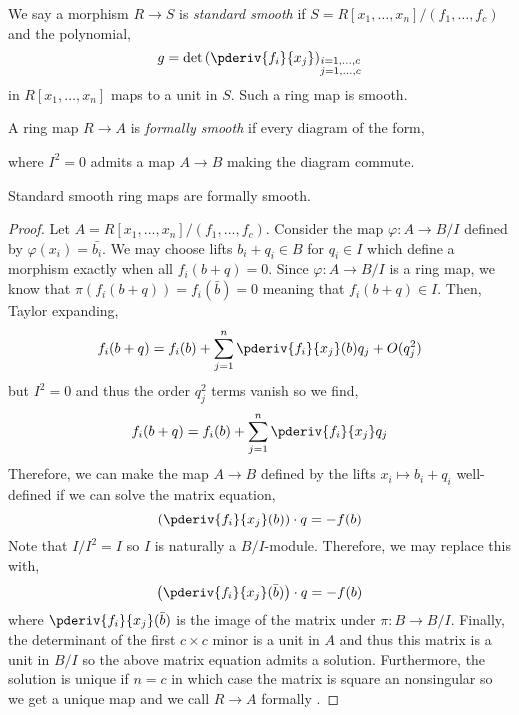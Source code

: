 \documentclass[12pt]{article}
\begin{document}
\begin{example}
We say a morphism $R \to S$ is \textit{standard smooth} if $S = R[x_1, \dots, x_n]/(f_1, \dots, f_c)$ and the polynomial,
\[ g = \det{\left( \pderiv{f_i}{x_j} \right)_{\substack{i = 1, \dots, c \\ j = 1, \dots, c}}} \]
in $R[x_1, \dots, x_n]$ maps to a unit in $S$. Such a ring map is smooth. 
\end{example}

\begin{defn}
A ring map $R \to A$ is \textit{formally smooth} if every diagram of the form,
\begin{center}
\end{center}
where $I^2 = 0$ admits a map $A \to B$ making the diagram commute.
\end{defn}

\begin{prop}
Standard smooth ring maps are formally smooth.
\end{prop}

\begin{proof}
Let $A = R[x_1, \dots, x_n]/(f_1, \dots, f_c)$. Consider the map $\varphi : A \to B / I$ defined by $\varphi(x_i) = \bar{b_i}$. We may choose lifts $b_i + q_i \in B$ for $q_i \in I$ which define a morphism exactly when all $f_i(b + q) = 0$. Since $\varphi : A \to B/I$ is a ring map, we know that $\pi(f_i(b + q)) = f_i(\bar{b}) = 0$ meaning that $f_i(b + q) \in I$. Then, Taylor expanding,
\[ f_i(b + q) = f_i(b) + \sum_{j = 1}^n \pderiv{f_i}{x_j} (b) q_j + O(q_j^2) \]
but $I^2 = 0$ and thus the order $q_j^2$ terms vanish so we find,
\[ f_i(b + q) = f_i(b) + \sum_{j = 1}^n \pderiv{f_i}{x_j} q_j \]
Therefore, we can make the map $A \to B$ defined by the lifts $x_i \mapsto b_i + q_i$ well-defined if we can solve the matrix equation,
\[ \left( \pderiv{f_i}{x_j}(b) \right) \cdot q = - f(b) \]
Note that $I / I^2 = I$ so $I$ is naturally a $B/I$-module. Therefore, we may replace this with,
\[ \left( \pderiv{f_i}{x_j}(\bar{b}) \right) \cdot q = - f(b) \]
where $\pderiv{f_i}{x_j}(\bar{b})$ is the image of the matrix under $\pi : B \to B/I$. Finally, the determinant of the first $c \times c$ minor is a unit in $A$ and thus this matrix is a unit in $B/I$ so the above matrix equation admits a solution. Furthermore, the solution is unique if $n = c$ in which case the matrix is square an nonsingular so we get a unique map and we call $R \to A$ formally \etale. 
\end{proof}
\end{document}
